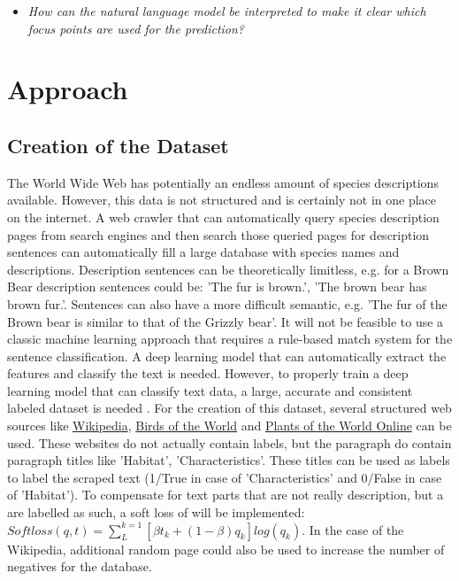 \documentclass{article}
\begin{document}
\noindent
\begin{itemize}
    \item \emph{How can the natural language model be interpreted to make it clear which focus points are used for the prediction?}
\end{itemize}


\section{Approach}
\subsection{Creation of the Dataset}
The World Wide Web has potentially an endless amount of species descriptions available.
However, this data is not structured and is certainly not in one place on the internet.
A web crawler that can automatically query species description pages from search engines and then search those queried pages for description sentences can automatically fill a large database with species names and descriptions. 
Description sentences can be theoretically limitless, e.g. for a Brown Bear description sentences could be: 'The fur is brown.', 'The brown bear has brown fur.'.
Sentences can also have a more difficult semantic, e.g. 'The fur of the Brown bear is similar to that of the Grizzly bear'.
It will not be feasible to use a classic machine learning approach that requires a rule-based match system for the sentence classification. 
A deep learning model that can automatically extract the features and classify the text is needed.
However, to properly train a deep learning model that can classify text data, a large, accurate and consistent labeled dataset is needed \cite{munappy_data_2019}.
For the creation of this dataset, several structured web sources like \href{http://www.Wikipedia.com}{Wikipedia}, \href{https://birdsoftheworld.org}{Birds of the World} and \href{http://powo.science.kew.org/}{Plants of the World Online} can be used.
These websites do not actually contain labels, but the paragraph do contain paragraph titles like 'Habitat', 'Characteristics'. 
These titles can be used as labels to label the scraped text (1/True in case of 'Characteristics' and 0/False in case of 'Habitat').
To compensate for text parts that are not really description, but a are labelled as such, a soft loss of \cite{reed_training_2015} will be implemented: \( Softloss(q, t) =  \sum_{L}^{k=1} [\beta t _k + (1- \beta )q _k]log(q _k) \).
In the case of the Wikipedia, additional random page could also be used to increase the number of negatives for the database.
\end{document}

